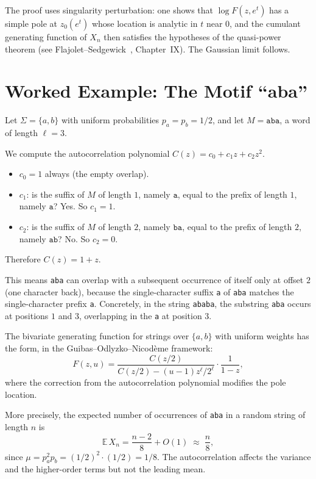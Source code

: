The proof uses singularity perturbation: one shows that $\log F(z, e^t)$ has a simple pole at $z_0(e^t)$ whose location is analytic in $t$ near $0$, and the cumulant generating function of $X_n$ then satisfies the hypotheses of the quasi-power theorem (see Flajolet--Sedgewick~\cite{FlajoletSedgewick2009}, Chapter~IX). The Gaussian limit follows.

\section{Worked Example: The Motif ``aba''}
\label{ch17:example-aba}

\begin{example}
\label{ch17:ex-aba}
Let $\Sigma = \{a, b\}$ with uniform probabilities $p_a = p_b = 1/2$, and let $M = \texttt{aba}$, a word of length $\ell = 3$.

We compute the autocorrelation polynomial $C(z) = c_0 + c_1 z + c_2 z^2$.

\begin{itemize}
  \item $c_0 = 1$ always (the empty overlap).
  \item $c_1$: is the suffix of $M$ of length $1$, namely $\texttt{a}$, equal to the prefix of length $1$, namely $\texttt{a}$? Yes. So $c_1 = 1$.
  \item $c_2$: is the suffix of $M$ of length $2$, namely $\texttt{ba}$, equal to the prefix of length $2$, namely $\texttt{ab}$? No. So $c_2 = 0$.
\end{itemize}

Therefore $C(z) = 1 + z$.

This means \texttt{aba} can overlap with a subsequent occurrence of itself only at offset $2$ (one character back), because the single-character suffix \texttt{a} of \texttt{aba} matches the single-character prefix \texttt{a}. Concretely, in the string \texttt{ababa}, the substring \texttt{aba} occurs at positions $1$ and $3$, overlapping in the \texttt{a} at position $3$.

The bivariate generating function for strings over $\{a,b\}$ with uniform weights has the form, in the Guibas--Odlyzko--Nicodème framework:
\[
  F(z, u) = \frac{C(z/2)}{C(z/2) - (u-1) z^\ell / 2^\ell}
            \cdot \frac{1}{1 - z},
\]
where the correction from the autocorrelation polynomial modifies the pole location.

More precisely, the expected number of occurrences of \texttt{aba} in a random string of length $n$ is
\[
  \mathbb{E}\, X_n = \frac{n - 2}{8} + O(1) \;\approx\; \frac{n}{8},
\]
since $\mu = p_a^2 p_b = (1/2)^2 \cdot (1/2) = 1/8$. The autocorrelation affects the variance and the higher-order terms but not the leading mean.
\end{example}

